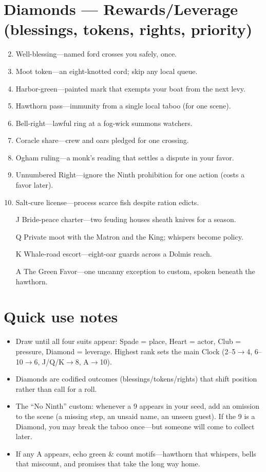 \section*{Diamonds --- Rewards/Leverage (blessings, tokens, rights, priority)}
\label{sec:theona-rewards}
\begin{enumerate}
\setcounter{enumi}{1}
\item Well-blessing---named ford crosses you safely, once.
\item Moot token---an eight-knotted cord; skip any local queue.
\item Harbor-green---painted mark that exempts your boat from the next levy.
\item Hawthorn pass---immunity from a single local taboo (for one scene).
\item Bell-right---lawful ring at a fog-wick summons watchers.
\item Coracle share---crew and oars pledged for one crossing.
\item Ogham ruling---a monk's reading that settles a dispute in your favor.
\item Unnumbered Right---ignore the Ninth prohibition for one action (costs a favor later).
\item Salt-cure license---process scarce fish despite ration edicts.
\item[J] Bride-peace charter---two feuding houses sheath knives for a season.
\item[Q] Private moot with the Matron and the King; whispers become policy.
\item[K] Whale-road escort---eight-oar guards across a Dolmis reach.
\item[A] The Green Favor---one uncanny exception to custom, spoken beneath the hawthorn.
\end{enumerate}

\section*{Quick use notes}
\label{sec:theona-quick-use}
\begin{itemize}
\item Draw until all four suits appear: Spade = place, Heart = actor, Club = pressure, Diamond = leverage. Highest rank sets the main Clock (2--5$\rightarrow$4, 6--10$\rightarrow$6, J/Q/K$\rightarrow$8, A$\rightarrow$10).
\item Diamonds are codified outcomes (blessings/tokens/rights) that shift position rather than call for a roll.
\item The ``No Ninth'' custom: whenever a 9 appears in your seed, add an omission to the scene (a missing step, an unsaid name, an unseen guest). If the 9 is a Diamond, you may break the taboo once---but someone will come to collect later.
\item If any A appears, echo green \& count motifs---hawthorn that whispers, bells that miscount, and promises that take the long way home.
\end{itemize}

